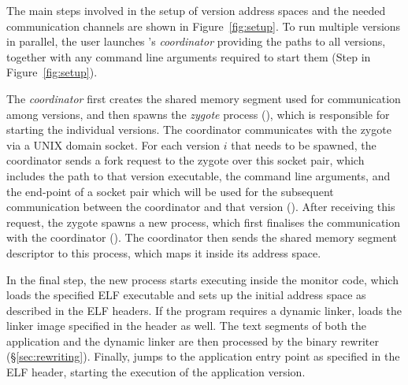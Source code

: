The main steps involved in the setup of version address spaces and the
needed communication channels are shown in Figure~\ref{fig:setup}.  To
run multiple versions in parallel, the user launches \varan's
\emph{coordinator} providing the paths to all versions, together with
any command line arguments required to start them (Step  in
Figure~\ref{fig:setup}).



The \emph{coordinator} first creates the shared memory segment
used for communication among versions, and then spawns the
\textit{zygote} process (), which is responsible for starting
the individual versions. The coordinator communicates with the zygote
via a UNIX domain socket. For each version $i$ that needs to be spawned,
the coordinator sends a fork request to the zygote over this socket
pair, which includes the path to that version executable, the command
line arguments, and the end-point of a socket pair which will be used
for the subsequent communication between the coordinator and that
version ().
%
After receiving this request, the zygote spawns a new process, which
first finalises the communication with the coordinator
().  The coordinator then sends the shared memory
segment descriptor to this process, which maps it inside its address
space.


In the final step, the new process starts executing inside the monitor
code, which loads the specified ELF executable and sets up the initial
address space as described in the ELF headers. If the program requires
a dynamic linker, \varan loads the linker image specified in the
header as well.
The text segments of both the application and the dynamic linker are
then processed by the binary rewriter (\S\ref{sec:rewriting}). Finally,
\varan jumps to the application entry point as specified in the ELF header,
starting the execution of the application version.

